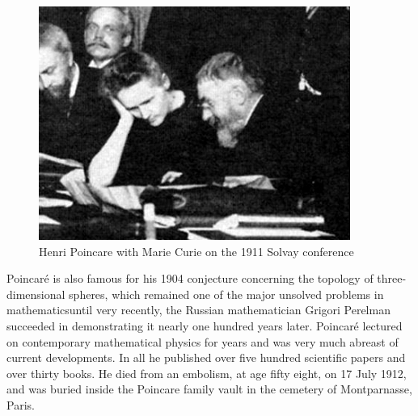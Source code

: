 \begin{figure}[hbt!]
\centering
\includegraphics[width=.5\textwidth]{./images/solvay.jpg}
\caption{Henri Poincare with Marie Curie on the 1911 Solvay conference}\label{fig1}
\end{figure}

Poincar\'{e} is also famous for his 1904 conjecture concerning the topology of three-dimensional spheres, which remained one of the major unsolved problems in mathematicsuntil very recently, the Russian mathematician Grigori Perelman succeeded in demonstrating it nearly one hundred years later. Poincaré lectured on contemporary mathematical physics for years and was very much abreast of current developments. In all he published over five hundred scientific papers and over thirty books. He died from an embolism, at age fifty eight, on 17 July 1912, and was buried inside the Poincare family vault in the cemetery of Montparnasse, Paris.
\clearpage

